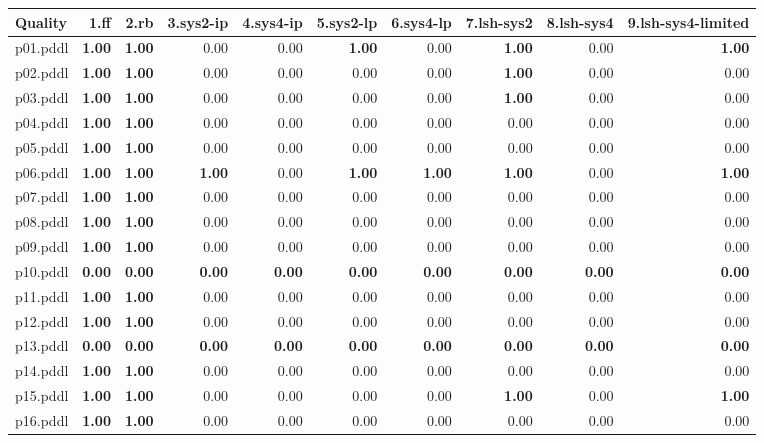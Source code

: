 \documentclass{article}
\begin{document}
\begin{tabular}{@{}lrrrrrrrrr@{}}
Quality & 1.ff & 2.rb & 3.sys2-ip & 4.sys4-ip & 5.sys2-lp & 6.sys4-lp & 7.lsh-sys2 & 8.lsh-sys4 & 9.lsh-sys4-limited \\
\midrule
p01.pddl & \textbf{1.00} & \textbf{1.00} & 0.00 & 0.00 & \textbf{1.00} & 0.00 & \textbf{1.00} & 0.00 & \textbf{1.00} \\
p02.pddl & \textbf{1.00} & \textbf{1.00} & 0.00 & 0.00 & 0.00 & 0.00 & \textbf{1.00} & 0.00 & 0.00 \\
p03.pddl & \textbf{1.00} & \textbf{1.00} & 0.00 & 0.00 & 0.00 & 0.00 & \textbf{1.00} & 0.00 & 0.00 \\
p04.pddl & \textbf{1.00} & \textbf{1.00} & 0.00 & 0.00 & 0.00 & 0.00 & 0.00 & 0.00 & 0.00 \\
p05.pddl & \textbf{1.00} & \textbf{1.00} & 0.00 & 0.00 & 0.00 & 0.00 & 0.00 & 0.00 & 0.00 \\
p06.pddl & \textbf{1.00} & \textbf{1.00} & \textbf{1.00} & 0.00 & \textbf{1.00} & \textbf{1.00} & \textbf{1.00} & 0.00 & \textbf{1.00} \\
p07.pddl & \textbf{1.00} & \textbf{1.00} & 0.00 & 0.00 & 0.00 & 0.00 & 0.00 & 0.00 & 0.00 \\
p08.pddl & \textbf{1.00} & \textbf{1.00} & 0.00 & 0.00 & 0.00 & 0.00 & 0.00 & 0.00 & 0.00 \\
p09.pddl & \textbf{1.00} & \textbf{1.00} & 0.00 & 0.00 & 0.00 & 0.00 & 0.00 & 0.00 & 0.00 \\
p10.pddl & \textbf{0.00} & \textbf{0.00} & \textbf{0.00} & \textbf{0.00} & \textbf{0.00} & \textbf{0.00} & \textbf{0.00} & \textbf{0.00} & \textbf{0.00} \\
p11.pddl & \textbf{1.00} & \textbf{1.00} & 0.00 & 0.00 & 0.00 & 0.00 & 0.00 & 0.00 & 0.00 \\
p12.pddl & \textbf{1.00} & \textbf{1.00} & 0.00 & 0.00 & 0.00 & 0.00 & 0.00 & 0.00 & 0.00 \\
p13.pddl & \textbf{0.00} & \textbf{0.00} & \textbf{0.00} & \textbf{0.00} & \textbf{0.00} & \textbf{0.00} & \textbf{0.00} & \textbf{0.00} & \textbf{0.00} \\
p14.pddl & \textbf{1.00} & \textbf{1.00} & 0.00 & 0.00 & 0.00 & 0.00 & 0.00 & 0.00 & 0.00 \\
p15.pddl & \textbf{1.00} & \textbf{1.00} & 0.00 & 0.00 & 0.00 & 0.00 & \textbf{1.00} & 0.00 & \textbf{1.00} \\
p16.pddl & \textbf{1.00} & \textbf{1.00} & 0.00 & 0.00 & 0.00 & 0.00 & 0.00 & 0.00 & 0.00 \\

\end{tabular}
\end{document}
